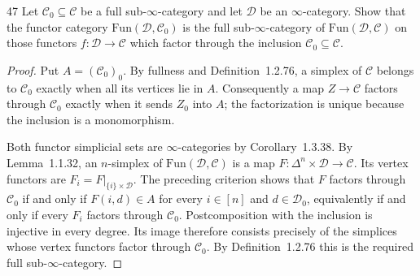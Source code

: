 \begin{exercise}{47}
Let $\mathcal C_0\subseteq\mathcal C$ be a full sub-$\infty$-category and let $\mathcal D$ be an $\infty$-category. Show that
the functor category $\mathrm{Fun}(\mathcal D,\mathcal C_0)$ is the full sub-$\infty$-category of $\mathrm{Fun}(\mathcal D,\mathcal C)$ on those functors
$f\colon\mathcal D\to\mathcal C$ which factor through the inclusion $\mathcal C_0\subseteq\mathcal C$.

\begin{proof}
Put $A=(\mathcal C_0)_0$.
By fullness and Definition~1.2.76, a simplex of $\mathcal C$
belongs to $\mathcal C_0$ exactly when all its vertices lie in $A$.
Consequently a map $Z\to\mathcal C$ factors through
$\mathcal C_0$ exactly when it sends $Z_0$ into $A$;
the factorization is unique because the inclusion is a monomorphism.

Both functor simplicial sets are $\infty$-categories by
Corollary~1.3.38. By Lemma~1.1.32, an $n$-simplex of
$\mathrm{Fun}(\mathcal D,\mathcal C)$ is a map
$F\colon\Delta^n\times\mathcal D\to\mathcal C$.
Its vertex functors are $F_i=F|_{\{i\}\times\mathcal D}$.
The preceding criterion shows that $F$ factors through
$\mathcal C_0$ if and only if $F(i,d)\in A$ for every
$i\in[n]$ and $d\in\mathcal D_0$, equivalently if and only
if every $F_i$ factors through $\mathcal C_0$.
Postcomposition with the inclusion is injective in every degree.
Its image therefore consists precisely of the simplices
whose vertex functors factor through $\mathcal C_0$.
By Definition~1.2.76 this is the required full sub-$\infty$-category.
\end{proof}
\end{exercise}

